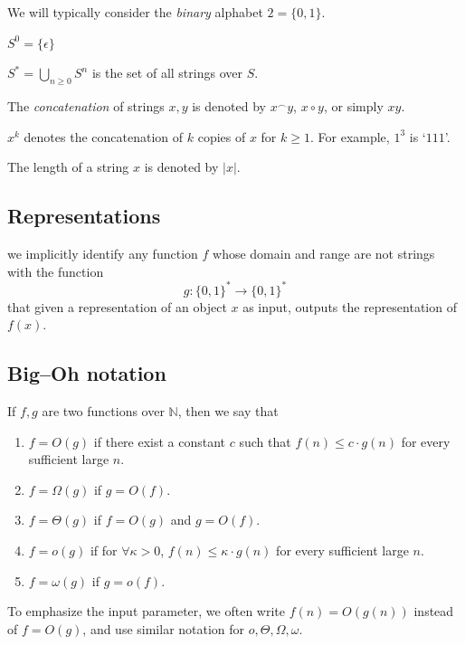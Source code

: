We will typically consider the \textit{binary} alphabet $2 = \{0,1\}$.


$S^0 = \{\epsilon\}$

$S^* = \bigcup_{n \geq 0} S^n$ is the set of all strings over $S$.


The \textit{concatenation} of strings $x,y$ is denoted by $x^\frown y$, $x \circ y$, or simply $xy$.


$x^k$ denotes the concatenation of $k$ copies of $x$ for $k \geq 1$. 
% 
For example, 
$1^3$ is `$111$'.

The length of a string $x$ is denoted by $|x|$.


\subsection{Representations}


we implicitly identify any function $f$ whose domain and range are not strings with the function 
\[
    g \colon \{0,1\}^* \to \{0,1\}^*
\]
that given a representation of an object $x$ as input, 
outputs the representation of $f (x)$. 


\subsection{Big--Oh notation}



\begin{df}
    If $f,g$ are two functions over $\mathbb{N}$, 
    then we say that 
    \begin{enumerate}[itemsep=5pt,parsep=5pt,leftmargin=3em,topsep=5pt,label=(\arabic*)] %
        \item 
        {\color{purple} $f = O(g)$} if there exist a constant $c$ such that $f(n) \leq c \cdot g(n)$ for every sufficient large $n$.

        \item 
        $f = \Omega(g)$ if $g = O(f)$.

        \item 
        $f = \Theta (g)$ if $f=O(g)$ and $g=O(f)$.

        \item 
        {\color{purple} $f=o(g)$} if for $\forall \kappa > 0$, 
        $f(n) \leq \kappa \cdot g(n)$ for every sufficient large $n$.

        \item 
        $f = \omega(g)$ if $g = o(f)$.
    \end{enumerate}   

    To emphasize the input parameter, 
    we often write {\color{purple} $f(n)=O(g(n))$} instead of $f= O(g)$, 
    and use similar notation for $o,\Theta,\Omega,\omega$.
\end{df}



